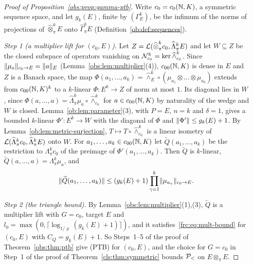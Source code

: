 \begin{proof}[Proof of Proposition~\ref{obs:prop:gamma-ptb}]
Write $c_0=c_0(\mathbb N,K)$, a symmetric sequence space, and let $g_k(E)$, finite by $(\Gamma^k_E)$, be the infimum of the norms
of projections of $\widehat\otimes^k_\pi E$ onto $\widehat\Gamma^k_\pi E$ (Definition~\ref{ob:def:sequences}).

\emph{Step 1 (a multiplier lift for $(c_0,E)$).} Let $Z=\mathcal L(\widehat\otimes^k_\pi c_0,\widehat\Lambda^k_\pi E)$ and let
$W\subseteq Z$ be the closed subspace of operators vanishing on $\mathcal N^k_{c_0}=\ker\widehat\wedge^k_{c_0}$. Since
$\lVert \mu_a\rVert_{c_0\to E}=\lVert a\rVert_E$ (Lemma~\ref{obs:lem:multiplier}(4)), $c_{00}(\mathbb N,K)$ is dense in $E$ and $Z$ is a Banach space, the map
$\Phi(a_1,\dots,a_k)=\widehat\wedge^k_E\circ(\mu_{a_1}\otimes\dots\otimes\mu_{a_k})$ extends from $c_{00}(\mathbb N,K)^k$ to a
$k$\nobreakdash-linear $\Phi\colon E^k\to Z$ of norm at most $1$. Its diagonal lies in $W$, since
$\Phi(a,\dots,a)=\widehat\Lambda^k_\pi\mu_a\circ\widehat\wedge^k_{c_0}$ for $a\in c_{00}(\mathbb N,K)$ by naturality of the wedge
and $W$ is closed. Lemma~\ref{ob:lem:parameter}(3), with $P=E$, $n=k$ and $\delta=1$, gives a bounded
$k$\nobreakdash-linear $\Phi'\colon E^k\to W$ with the diagonal of $\Phi$ and $\lVert \Phi'\rVert\le g_k(E)+1$. By
Lemma~\ref{ob:lem:metric-surjection}, $T\mapsto T\circ\widehat\wedge^k_{c_0}$ is a linear isometry of
$\mathcal L(\widehat\Lambda^k_\pi c_0,\widehat\Lambda^k_\pi E)$ onto $W$. For $a_1,\dots,a_k\in c_{00}(\mathbb N,K)$ let
$\widetilde Q(a_1,\dots,a_k)$ be the restriction to $\Lambda^k_\pi c_0$ of the preimage of $\Phi'(a_1,\dots,a_k)$. Then
$\widetilde Q$ is $k$\nobreakdash-linear, $\widetilde Q(a,\dots,a)=\Lambda^k_\pi\mu_a$, and
\[
 \lVert \widetilde Q(a_1,\dots,a_k)\rVert\le(g_k(E)+1)\prod_{\gamma=1}^k\lVert \mu_{a_\gamma}\rVert_{c_0\to E}.
\]

\emph{Step 2 (the triangle bound).} By Lemma~\ref{obs:lem:multiplier}(1),(3), $\widetilde Q$ is a multiplier lift with
$G=c_0$, target $E$ and $l_0=\max(0,\lceil\log_{1/\varrho}(g_k(E)+1)\rceil)$, and it satisfies~\eqref{frc:eq:mult-bound}
for $(c_0,E)$ with $C_Q=g_k(E)+1$. So Steps~1--5 of the proof of Theorem~\ref{obs:thm:ptb} give \textup{(PTB)} for
$(c_0,E)$, and the choice for $G=c_0$ in Step~1 of the proof of Theorem~\ref{cls:thm:symmetric} bounds $\mathcal P_<$ on
$E\otimes_\pi E$.
\end{proof}

